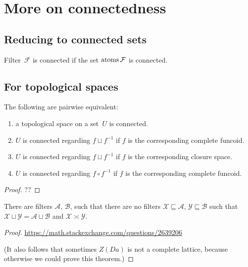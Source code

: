 \chapter{More on connectedness}

\section{Reducing to connected sets}

\begin{conjecture}
Filter~$\mathcal{F}$ is connected if the set
$\operatorname{atoms}\mathcal{F}$ is connected.
\end{conjecture}

\section{For topological spaces}

\begin{prop}
The following are pairwise equivalent:
\begin{enumerate}
 \item a topological space on a set~$U$ is connected.
 \item $U$ is connected regarding $f\sqcup f^{-1}$ if $f$ is the corresponding
   complete funcoid.
 \item $U$ is connected regarding $f\sqcup f^{-1}$ if $f$ is the corresponding
   closure space.
 \item $U$ is connected regarding $f\circ f^{-1}$ if $f$ is the corresponding
   complete funcoid.
\end{enumerate}
\end{prop}

\begin{proof}
??
\end{proof}

\begin{prop}
  There are filters $\mathcal{A}$, $\mathcal{B}$, such that there are no
  filters $\mathcal{X} \sqsubseteq \mathcal{A}$, $\mathcal{Y} \sqsubseteq
  \mathcal{B}$ such that $\mathcal{X} \sqcup \mathcal{Y} = \mathcal{A} \sqcup
  \mathcal{B}$ and $\mathcal{X} \asymp \mathcal{Y}$.
\end{prop}

\begin{proof}
  \url{https://math.stackexchange.com/questions/2639206}

  (It also follows that sometimes $Z (D a)$ is not a complete lattice, because
  otherwise we could prove this theorem.)
\end{proof}


